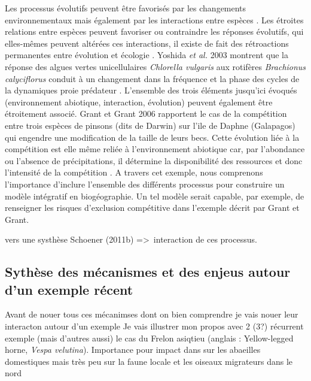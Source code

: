 Les processus évolutifs peuvent être favorisés par les changements
environnementaux mais également par les interactions entre espèces
\cite{Tingley2009}. Les étroites relations entre espèces peuvent
favoriser ou contraindre les réponses évolutifs, qui elles-mêmes peuvent
altérées ces interactions, il existe de fait des rétroactions
permanentes entre évolution et écologie \cite{Post2009}. Yoshida
\textit{et al.} 2003 montrent que la réponse des algues vertes
unicellulaires \textit{Chlorella vulgaris} aux rotifères
\textit{Brachionus calyciflorus} conduit à un changement dans la
fréquence et la phase des cycles de la dynamiques proie prédateur
\cite{Yoshida2003}. L'ensemble des trois éléments jusqu'ici évoqués
(environnement abiotique, interaction, évolution) peuvent également être
étroitement associé. Grant et Grant 2006 rapportent le cas de la
compétition entre trois espèces de pinsons (dits de Darwin) sur l'ile de
Daphne (Galapagos) qui engendre une modification de la taille de leurs
becs. Cette évolution liée à la compétition est elle même reliée à
l'environnement abiotique car, par l'abondance ou l'absence de
précipitations, il détermine la disponibilité des ressources et donc
l'intensité de la compétition \cite{Grant2006}. A travers cet exemple,
nous comprenons l'importance d'inclure l'ensemble des différents
processus pour construire un modèle intégratif en biogéographie. Un tel
modèle serait capable, par exemple, de renseigner les risques
d'exclusion compétitive dans l'exemple décrit par Grant et Grant.

vers une systhèse Schoener (2011b) =\textgreater{}~interaction de ces
processus.

\subsection*{Sythèse des mécanismes et des enjeus autour d'un exemple
récent}\label{sythuxe8se-des-muxe9canismes-et-des-enjeus-autour-dun-exemple-ruxe9cent}

Avant de nouer tous ces mécanimses dont on bien comprendre je vais nouer
leur interacton autour d'un exemple Je vais illustrer mon propos avec 2
(3?) récurrent exemple (mais d'autres aussi) le cas du Frelon asiqtieu
(anglais : Yellow-legged horne, \emph{Vespa velutina}). Importance pour
impact dans sur les abaeilles domestiques mais très peu sur la faune
locale et les oiseaux migrateurs dans le nord

